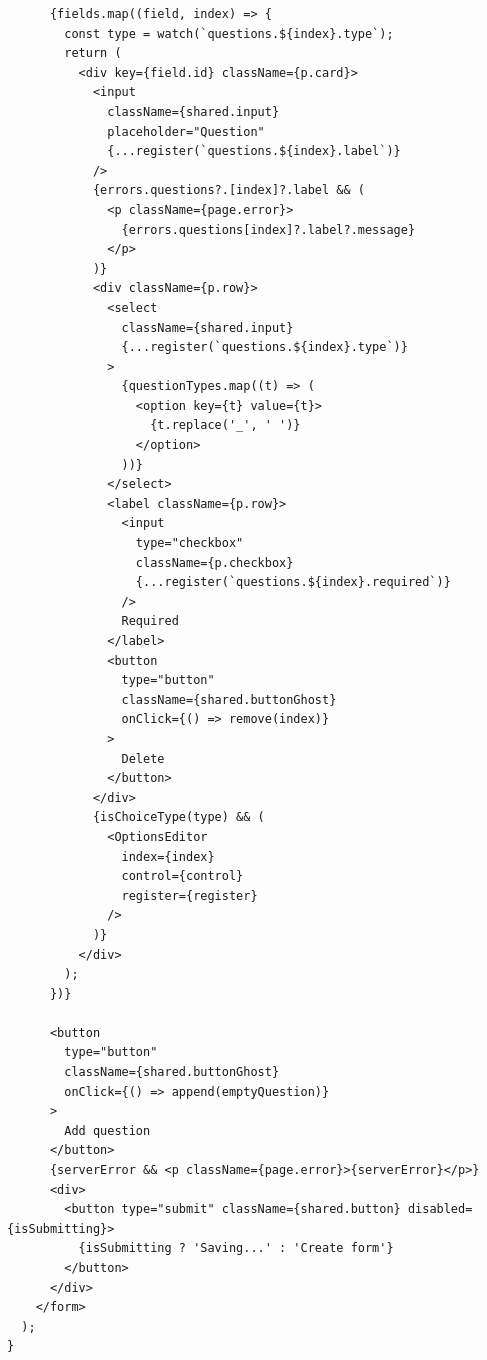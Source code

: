 \documentclass[11pt,a4paper]{article}
\begin{document}
\begin{lstlisting}
      {fields.map((field, index) => {
        const type = watch(`questions.${index}.type`);
        return (
          <div key={field.id} className={p.card}>
            <input
              className={shared.input}
              placeholder="Question"
              {...register(`questions.${index}.label`)}
            />
            {errors.questions?.[index]?.label && (
              <p className={page.error}>
                {errors.questions[index]?.label?.message}
              </p>
            )}
            <div className={p.row}>
              <select
                className={shared.input}
                {...register(`questions.${index}.type`)}
              >
                {questionTypes.map((t) => (
                  <option key={t} value={t}>
                    {t.replace('_', ' ')}
                  </option>
                ))}
              </select>
              <label className={p.row}>
                <input
                  type="checkbox"
                  className={p.checkbox}
                  {...register(`questions.${index}.required`)}
                />
                Required
              </label>
              <button
                type="button"
                className={shared.buttonGhost}
                onClick={() => remove(index)}
              >
                Delete
              </button>
            </div>
            {isChoiceType(type) && (
              <OptionsEditor
                index={index}
                control={control}
                register={register}
              />
            )}
          </div>
        );
      })}

      <button
        type="button"
        className={shared.buttonGhost}
        onClick={() => append(emptyQuestion)}
      >
        Add question
      </button>
      {serverError && <p className={page.error}>{serverError}</p>}
      <div>
        <button type="submit" className={shared.button} disabled={isSubmitting}>
          {isSubmitting ? 'Saving...' : 'Create form'}
        </button>
      </div>
    </form>
  );
}
\end{lstlisting}
\end{document}
